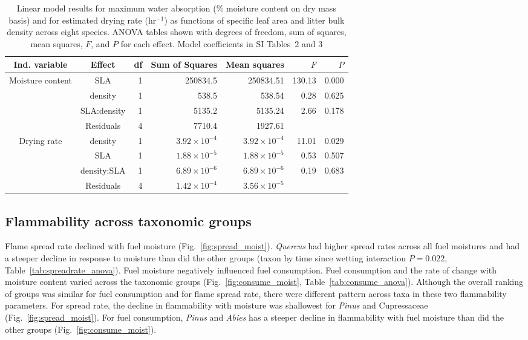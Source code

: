\documentclass[letterpaper,12pt]{article}
\begin{document}
\begin{table}[h]
  \caption{Linear model results for maximum water absorption (\% moisture
    content on dry mass basis) and for estimated drying rate (hr$^{-1}$) as
    functions of specific leaf area and litter bulk density across eight
    species. ANOVA tables shown with degrees of freedom, sum of squares, mean
    squares, $F$, and $P$ for each effect. Model coefficients in SI Tables~2 and 3}
  \label{tab:mc_di_anova}
\centering

\begin{tabular}{ccrrrrr}
  \toprule
Ind. variable & Effect & df & Sum of Squares & Mean squares & $F$ & $P$ \\ 
  \midrule
Moisture content & SLA & 1 & 250834.5 & 250834.51 & 130.13 & 0.000 \\ 
  & density & 1 & 538.5 & 538.54 & 0.28 & 0.625 \\ 
  & SLA:density & 1 & 5135.2 & 5135.24 & 2.66 & 0.178 \\ 
  & Residuals & 4 & 7710.4 & 1927.61 &  &  \\ 
  \midrule
  
Drying rate & density & 1 & $3.92 \times 10^{-4}$ & $3.92 \times 10^{-4}$ & 11.01 & 0.029 \\ 
 &  SLA & 1 & $1.88 \times 10^{-5}$ & $1.88 \times 10^{-5}$ & 0.53 & 0.507 \\ 
 &  density:SLA & 1 & $6.89 \times 10^{-6}$ & $6.89 \times 10^{-6}$ & 0.19 & 0.683 \\ 
 &  Residuals & 4 & $1.42 \times 10^{-4}$ & $3.56 \times 10^{-5}$ &  &  \\ 
   \bottomrule

\end{tabular}
\end{table}

\subsection{Flammability across taxonomic groups}

Flame spread rate declined with fuel moisture (Fig.~\ref{fig:spread_moist}).
\emph{Quercus} had higher spread rates across all fuel moistures and had a
steeper decline in response to moisture than did the other groups (taxon by
time since wetting interaction $P = 0.022$, Table~\ref{tab:spreadrate_anova}).
Fuel moisture negatively influenced fuel consumption. Fuel consumption and the
rate of change with moisture content varied across the taxonomic groups
(Fig.~\ref{fig:consume_moist}, Table~\ref{tab:consume_anova}). Although the
overall ranking of groups was similar for fuel consumption and for flame spread
rate, there were different pattern across taxa in these two flammability
parameters. For spread rate, the decline in flammability with moisture was
shallowest for \emph{Pinus} and Cupressaceae (Fig.~\ref{fig:spread_moist}). For
fuel consumption, \emph{Pinus} and \emph{Abies} has a steeper decline in
flammability with fuel moisture than did the other groups
(Fig.~\ref{fig:consume_moist}).
\end{document}
